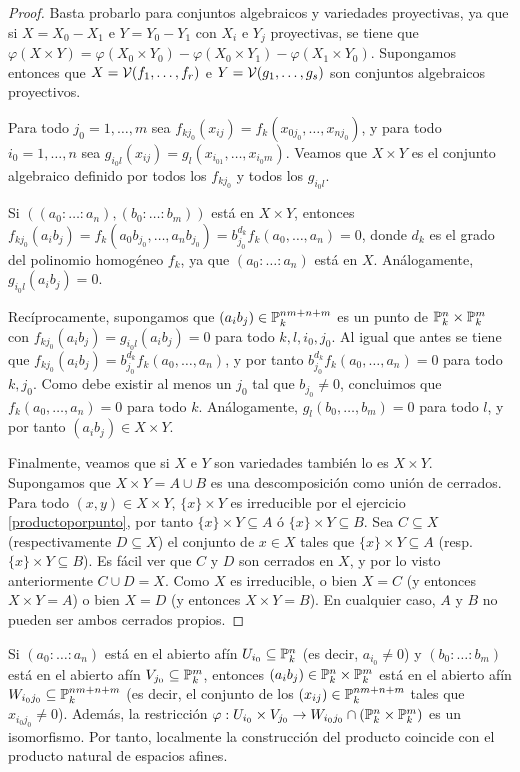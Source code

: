 \documentclass[ACGA.tex]{subfiles}
\begin{document}
\begin{proof}
 Basta probarlo para conjuntos algebraicos y variedades proyectivas, ya que si $X=X_0-X_1$ e $Y=Y_0-Y_1$ con $X_i$ e $Y_j$ proyectivas, se tiene que $\varphi(X\times Y)=\varphi(X_0\times Y_0)-\varphi(X_0\times Y_1)-\varphi(X_1\times Y_0)$. Supongamos entonces que $X=\mathcal{V}(f_1,\ldots,f_r)$ e $Y=\mathcal{V}(g_1,\ldots,g_s)$ son conjuntos algebraicos proyectivos.

Para todo $j_0=1,\ldots,m$ sea $f_{kj_0}(x_{ij})=f_k(x_{0j_0},\ldots,x_{nj_0})$, y para todo $i_0=1,\ldots,n$ sea $g_{i_0l}(x_{ij})=g_l(x_{i_01},\ldots,x_{i_0m})$. Veamos que $X\times Y$ es el conjunto algebraico definido por todos los $f_{kj_0}$ y todos los $g_{i_0l}$. 

Si $((a_0:\ldots:a_n),(b_0:\ldots:b_m))$ está en $X\times Y$, entonces $f_{kj_0}(a_ib_j)=f_k(a_0b_{j_0},\ldots,a_nb_{j_0})=b_{j_0}^{d_k}f_k(a_0,\ldots,a_n)=0$, donde $d_k$ es el grado del polinomio homogéneo $f_k$, ya que $(a_0:\ldots:a_n)$ está en $X$. Análogamente, $g_{i_0l}(a_ib_j)=0$.

Recíprocamente, supongamos que $(a_ib_j)\in\mathbb{P}^{nm+n+m}_k$ es un punto de $\mathbb{P}^n_k\times\mathbb{P}^m_k$ con $f_{kj_0}(a_ib_j)=g_{i_0l}(a_ib_j)=0$ para todo $k,l,i_0,j_0$. Al igual que antes se tiene que $f_{kj_0}(a_ib_j)=b_{j_0}^{d_k}f_k(a_0,\ldots,a_n)$, y por tanto $b_{j_0}^{d_k}f_k(a_0,\ldots,a_n)=0$ para todo $k,j_0$. Como debe existir al menos un $j_0$ tal que $b_{j_0}\neq 0$, concluimos que $f_k(a_0,\ldots,a_n)=0$ para todo $k$. Análogamente, $g_l(b_0,\ldots,b_m)=0$ para todo $l$, y por tanto $(a_ib_j)\in X\times Y$.

Finalmente, veamos que si $X$ e $Y$ son variedades también lo es $X\times Y$. Supongamos que $X\times Y=A\cup B$ es una descomposición como unión de cerrados. Para todo $(x,y)\in X\times Y$, $\{x\}\times Y$ es irreducible por el ejercicio \ref{productoporpunto}, por tanto $\{x\}\times Y\subseteq A$ ó $\{x\}\times Y\subseteq B$. Sea $C\subseteq X$ (respectivamente $D\subseteq X$) el conjunto de $x\in X$ tales que $\{x\}\times Y\subseteq A$ (resp. $\{x\}\times Y\subseteq B$). Es fácil ver que $C$ y $D$ son cerrados en $X$, y por lo visto anteriormente $C\cup D=X$. Como $X$ es irreducible, o bien $X=C$ (y entonces $X\times Y=A$) o bien $X=D$ (y entonces $X\times Y=B$). En cualquier caso, $A$ y $B$ no pueden ser ambos cerrados propios.
\end{proof}

Si $(a_0:\ldots:a_n)$ está en el abierto afín $U_{i_0}\subseteq\mathbb{P}^n_k$ (es decir, $a_{i_0}\neq 0$) y $(b_0:\ldots:b_m)$ está en el abierto afín $V_{j_0}\subseteq\mathbb{P}^m_k$, entonces $(a_ib_j)\in\mathbb{P}^n_k\times\mathbb{P}^m_k$ está en el abierto afín $W_{i_0j_0}\subseteq\mathbb{P}^{nm+n+m}_k$ (es decir, el conjunto de los $(x_{ij})\in\mathbb{P}^{nm+n+m}_k$ tales que $x_{i_0j_0}\neq 0$). Además, la restricción $\varphi:U_{i_0}\times V_{j_0}\to W_{i_0j_0}\cap(\mathbb{P}^n_k\times\mathbb{P}^m_k)$ es un isomorfismo. Por tanto, localmente la construcción del producto coincide con el producto natural de espacios afines.
\end{document}
